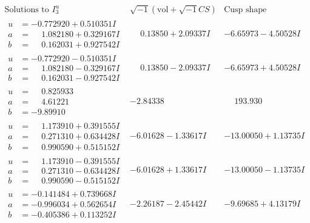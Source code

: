 \documentclass[1p]{elsarticle_modified}
\theoremstyle{definition}
\newcommand{\I}{\sqrt{-1}}
\begin{document}
$$\begin{array}{c|c|c}  
\text{Solutions to }I^u_{3}& \I (\text{vol} + \sqrt{-1}CS) & \text{Cusp shape}\\
 \hline 
\begin{aligned}
u &= -0.772920 + 0.510351 I \\
a &= \phantom{-}1.082180 + 0.329167 I \\
b &= \phantom{-}0.162031 + 0.927542 I\end{aligned}
 & \phantom{-}0.13850 + 2.09337 I & -6.65973 - 4.50528 I \\ \hline\begin{aligned}
u &= -0.772920 - 0.510351 I \\
a &= \phantom{-}1.082180 - 0.329167 I \\
b &= \phantom{-}0.162031 - 0.927542 I\end{aligned}
 & \phantom{-}0.13850 - 2.09337 I & -6.65973 + 4.50528 I \\ \hline\begin{aligned}
u &= \phantom{-}0.825933\phantom{ +0.000000I} \\
a &= \phantom{-}4.61221\phantom{ +0.000000I} \\
b &= -9.89910\phantom{ +0.000000I}\end{aligned}
 & -2.84338\phantom{ +0.000000I} & \phantom{-}193.930\phantom{ +0.000000I} \\ \hline\begin{aligned}
u &= \phantom{-}1.173910 + 0.391555 I \\
a &= \phantom{-}0.271310 + 0.634428 I \\
b &= \phantom{-}0.990590 + 0.515152 I\end{aligned}
 & -6.01628 - 1.33617 I & -13.00050 + 1.13735 I \\ \hline\begin{aligned}
u &= \phantom{-}1.173910 - 0.391555 I \\
a &= \phantom{-}0.271310 - 0.634428 I \\
b &= \phantom{-}0.990590 - 0.515152 I\end{aligned}
 & -6.01628 + 1.33617 I & -13.00050 - 1.13735 I \\ \hline\begin{aligned}
u &= -0.141484 + 0.739668 I \\
a &= -0.996034 + 0.562654 I \\
b &= -0.405386 + 0.113252 I\end{aligned}
 & -2.26187 - 2.45442 I & -9.69685 + 4.13179 I \\ \hline\begin{aligned}

\end{aligned}
\end{array}$$
\end{document}
